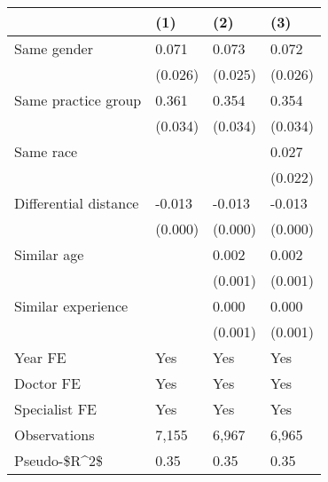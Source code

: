 \begin{tabular}{llll}
\hline
& (1) & (2) & (3) \\ \hline
Same gender                        & 0.071   & 0.073   & 0.072   \\
& (0.026) & (0.025) & (0.026) \\
Same practice group                & 0.361   & 0.354   & 0.354   \\
& (0.034) & (0.034) & (0.034) \\
Same race                          &         &         & 0.027   \\
&         &         & (0.022) \\
Differential distance              & -0.013  & -0.013  & -0.013  \\
& (0.000) & (0.000) & (0.000) \\
Similar age                        &         & 0.002   & 0.002   \\
&         & (0.001) & (0.001) \\
Similar experience                 &         & 0.000   & 0.000   \\
&         & (0.001) & (0.001) \\
Year FE                            & Yes     & Yes     & Yes     \\
Doctor FE                          & Yes     & Yes     & Yes     \\
Specialist FE                      & Yes     & Yes     & Yes     \\
Observations                       & 7,155   & 6,967   & 6,965   \\
Pseudo-\$R\textasciicircum{}2\$ & 0.35    & 0.35    & 0.35    \\
\hline
\end{tabular}
